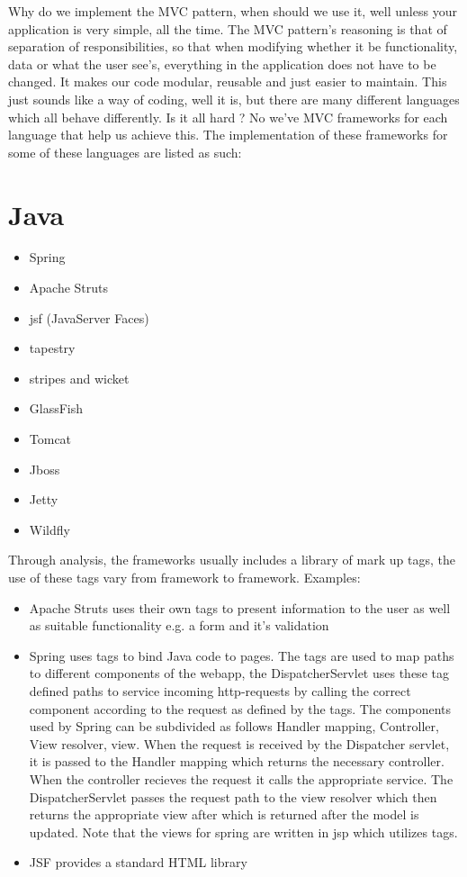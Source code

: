 Why do we implement the MVC pattern, when should we use it, well unless your application is very simple, all the time.
The MVC pattern's reasoning is that of separation of responsibilities, so that when modifying whether it be functionality, data or what the user see's, everything in the
application does not have to be changed. It makes our code modular, reusable and just easier to maintain.
This just sounds like a way of coding, well it is, but there are many different languages which all behave differently.
Is it all hard ? No  we've MVC frameworks for each language that help us achieve this. The implementation of these frameworks
for some of these languages are listed as such:

\section{Java}
\begin{itemize}
  \item Spring
  \item Apache Struts
  \item jsf (JavaServer Faces)
  \item tapestry
  \item stripes and wicket
  \item GlassFish
  \item Tomcat
  \item Jboss
  \item Jetty
  \item Wildfly
\end{itemize}

Through analysis, the frameworks usually includes a library of mark up tags, the use of these tags vary from framework to framework. Examples:
\begin{itemize}
  \item Apache Struts uses their own tags to present information to the user as well as suitable functionality e.g. a form and it's validation
  \item Spring uses tags to bind Java code to pages. The tags are used to map paths to different components of the webapp, the DispatcherServlet uses these tag
  defined paths to service incoming http-requests by calling the correct component according to the request as defined by the tags. The components used by Spring can be
  subdivided as follows Handler mapping, Controller, View resolver, view. When the request is received by the Dispatcher servlet,
  it is passed to the Handler mapping which returns the necessary controller. When the controller recieves the request it calls the appropriate service.
  The DispatcherServlet passes the request path to the view resolver which then returns the appropriate view after which is returned after the model is updated.
  Note that the views for spring are written in jsp which utilizes tags.
  \item JSF provides a standard HTML library
\end{itemize}\par

